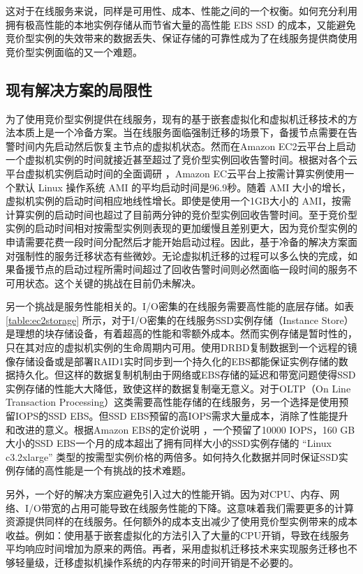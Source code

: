 这对于在线服务来说，同样是可用性、成本、性能之间的一个权衡。如何充分利用拥有极高性能的本地实例存储从而节省大量的高性能 EBS SSD 的成本，又能避免竞价型实例的失效带来的数据丢失、保证存储的可靠性成为了在线服务提供商使用竞价型实例面临的又一个难题。
\subsection{现有解决方案的局限性}
\label{sec:gemini_challenges}
为了使用竞价型实例提供在线服务，现有的基于嵌套虚拟化和虚拟机迁移技术的方法\cite{He:2015:CCH:2749246.2749275}本质上是一个冷备方案。当在线服务面临强制迁移的场景下，备援节点需要在告警时间内先启动然后恢复主节点的虚拟机状态。然而在Amazon EC2云平台上启动一个虚拟机实例的时间就接近甚至超过了竞价型实例回收告警时间。根据对各个云平台虚拟机实例启动时间的全面调研 \cite{Mao:2012:PSV:2353730.2353859}，Amazon EC云平台上按需计算实例使用一个默认 Linux 操作系统 AMI 的平均启动时间是96.9秒。随着 AMI 大小的增长，虚拟机实例的启动时间相应地线性增长。即使是使用一个1GB大小的 AMI，按需计算实例的启动时间也超过了目前两分钟的竞价型实例回收告警时间。至于竞价型实例的启动时间相对按需型实例则表现的更加缓慢且差别更大，因为竞价型实例的申请需要花费一段时间分配然后才能开始启动过程。因此，基于冷备的解决方案面对强制性的服务迁移状态有些微妙。无论虚拟机迁移的过程可以多么快的完成，如果备援节点的启动过程所需时间超过了回收告警时间则必然面临一段时间的服务不可用状态。这个关键的挑战在目前仍未解决。

另一个挑战是服务性能相关的。I/O密集的在线服务需要高性能的底层存储。如表 \ref{table:ec2storage} 所示，对于I/O密集的在线服务SSD实例存储（Instance Store）是理想的块存储设备，有着超高的性能和零额外成本。然而实例存储是暂时性的，只在其对应的虚拟机实例的生命周期内可用。使用DRBD复制数据到一个远程的镜像存储设备或是部署RAID1实时同步到一个持久化的EBS都能保证实例存储的数据持久化。但这样的数据复制机制由于网络或EBS存储的延迟和带宽问题使得SSD实例存储的性能大大降低，致使这样的数据复制毫无意义。对于OLTP（On Line Transaction Processing）这类需要高性能存储的在线服务，另一个选择是使用预留IOPS的SSD EBS。但SSD EBS预留的高IOPS需求大量成本，消除了性能提升和改进的意义。根据Amazon EBS的定价说明 \cite{EBSPricing:2015}，一个预留了10000 IOPS，160 GB 大小的SSD EBS一个月的成本超出了拥有同样大小的SSD实例存储的 ``Linux c3.2xlarge'' 类型的按需型实例价格的两倍多。如何持久化数据并同时保证SSD实例存储的高性能是一个有挑战的技术难题。

另外，一个好的解决方案应避免引入过大的性能开销。因为对CPU、内存、网络、I/O带宽的占用可能导致在线服务性能的下降。这意味着我们需要更多的计算资源提供同样的在线服务。任何额外的成本支出减少了使用竞价型实例带来的成本收益。例如：使用基于嵌套虚拟化的方法引入了大量的CPU开销，导致在线服务平均响应时间增加为原来的两倍。再者，采用虚拟机迁移技术来实现服务迁移也不够轻量级，迁移虚拟机操作系统的内存带来的时间开销是不必要的。

